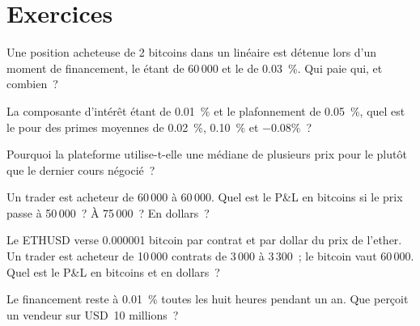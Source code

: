 \section{Exercices}

\begin{exercise}[$\star$]\label{exo:m3:perpetual-futures:1}
Une position acheteuse de 2 bitcoins dans un  linéaire est détenue lors d'un moment de financement, le  étant de 60\,000 et le  de 0.03~\%. Qui paie qui, et combien~?
\end{exercise}

\begin{exercise}[$\star$]\label{exo:m3:perpetual-futures:2}
La composante d'intérêt étant de 0.01~\% et le plafonnement de 0.05~\%, quel est le  pour des primes moyennes de 0.02~\%,
0.10~\% et $-0.08\%$~?
\end{exercise}

\begin{exercise}[$\star$]\label{exo:m3:perpetual-futures:3}
Pourquoi la plateforme utilise-t-elle une médiane de plusieurs prix pour le  plutôt que le dernier cours négocié~?
\end{exercise}

\begin{exercise}[$\star\star$]\label{exo:m3:perpetual-futures:4}
Un trader est acheteur de 60\,000  à 60\,000. Quel est le P\&L en bitcoins si le prix passe à 50\,000~? À
75\,000~? En dollars~?
\end{exercise}

\begin{exercise}[$\star\star$]\label{exo:m3:perpetual-futures:5}
Le  ETHUSD verse 0.000001 bitcoin par contrat et par dollar du prix de l'ether. Un trader est acheteur de 10\,000 contrats
de 3\,000 à 3\,300~; le bitcoin vaut 60\,000. Quel est le P\&L en bitcoins et en dollars~?
\end{exercise}

\begin{exercise}[$\star\star$]\label{exo:m3:perpetual-futures:6}
Le financement reste à 0.01~\% toutes les huit heures pendant un an. Que perçoit un vendeur sur USD~10 millions~?
\end{exercise}


